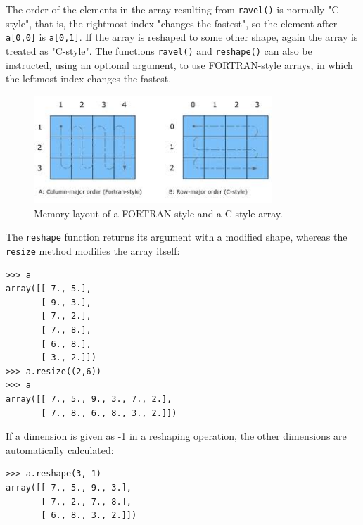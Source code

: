 \documentclass[12pt]{article}
\begin{document}
The order of the elements in the array resulting from \texttt{ravel()} is normally "C-style", that is, the rightmost index "changes the fastest", so the element after \texttt{a[0,0]} is \texttt{a[0,1]}. If the array is reshaped to some other shape, again the array is treated as "C-style".  The functions \texttt{ravel()} and \texttt{reshape()} can also be instructed, using an optional argument, to use FORTRAN-style arrays, in which the leftmost index changes the fastest.
\begin{figure}[ht]
\centerline{\includegraphics[width=0.8\textwidth]{memory.jpeg}}
\caption{Memory layout of a FORTRAN-style  and a C-style array.} 
\end{figure}

The \texttt{reshape} function returns its argument with a modified shape, whereas the \texttt{resize} method modifies the array itself:
\footnotesize
\begin{Verbatim}[frame=single]
>>> a
array([[ 7., 5.],
       [ 9., 3.],
       [ 7., 2.],
       [ 7., 8.],
       [ 6., 8.],
       [ 3., 2.]])
>>> a.resize((2,6))
>>> a
array([[ 7., 5., 9., 3., 7., 2.],
       [ 7., 8., 6., 8., 3., 2.]])
\end{Verbatim}
\normalsize
If a dimension is given as -1 in a reshaping operation, the other dimensions are automatically calculated:
\footnotesize
\begin{Verbatim}[frame=single]
>>> a.reshape(3,-1)
array([[ 7., 5., 9., 3.],
       [ 7., 2., 7., 8.],
       [ 6., 8., 3., 2.]])
\end{Verbatim}
\normalsize
\end{document}
